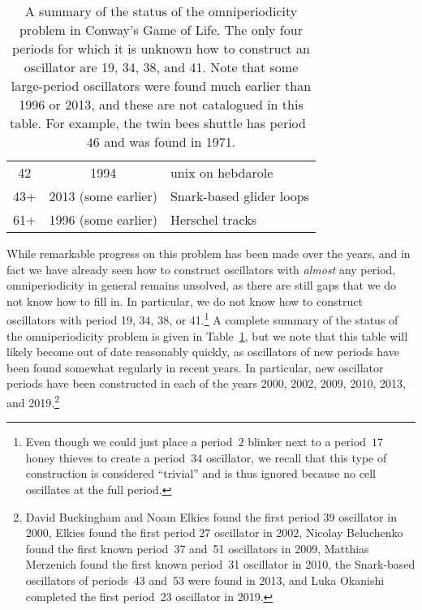 \begin{table}[!ptb]
\begin{center}
\begin{tabular}{c c l}
			42 & 1994 & unix on hebdarole \\
			\rowcolor{gray!20} 43+ & 2013 (some earlier) & Snark-based glider loops \\
			61+ & 1996 (some earlier) & Herschel tracks \\\bottomrule
		\end{tabular}
		\caption{A summary of the status of the omniperiodicity problem in Conway's Game of Life. The only four periods for which it is unknown how to construct an oscillator are 19, 34, 38, and 41. Note that some large-period oscillators were found much earlier than 1996 or 2013, and these are not catalogued in this table. For example, the twin bees shuttle has period~$46$ and was found in 1971.}\label{tab:omniperiodic}
	\end{center}
\end{table}
\endgroup

While remarkable progress on this problem has been made over the years, and in fact we have already seen how to construct oscillators with \emph{almost} any period, omniperiodicity in general remains unsolved, as there are still gaps that we do not know how to fill in. In particular, we do not know how to construct oscillators with period 19, 34, 38, or 41.\footnote{Even though we could just place a period~$2$ blinker next to a period~$17$ honey thieves to create a period~$34$ oscillator, we recall that this type of construction is considered ``trivial'' and is thus ignored because no cell oscillates at the full period.} A complete summary of the status of the omniperiodicity problem is given in Table~\ref{tab:omniperiodic}, but we note that this table will likely become out of date reasonably quickly, as oscillators of new periods have been found somewhat regularly in recent years. In particular, new oscillator periods have been constructed in each of the years 2000, 2002, 2009, 2010, 2013, and 2019.\footnote{David Buckingham and Noam Elkies found the first period 39 oscillator in 2000, Elkies found the first period 27 oscillator in 2002, Nicolay Beluchenko found the first known period~37 and~51 oscillators in 2009, Matthias Merzenich found the first known period~31 oscillator in 2010, the Snark-based oscillators of periods~43 and~53 were found in 2013, and Luka Okanishi completed the first period~23 oscillator in 2019.}


